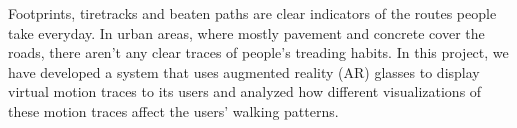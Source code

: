 Footprints, tiretracks and beaten paths are clear indicators of the routes people take everyday. In urban areas, where mostly pavement and concrete cover the roads, there aren't any clear traces of people's treading habits. In this project, we have developed a system that uses augmented reality (AR) glasses to display virtual motion traces to its users and analyzed how different visualizations of these motion traces affect the users' walking patterns.